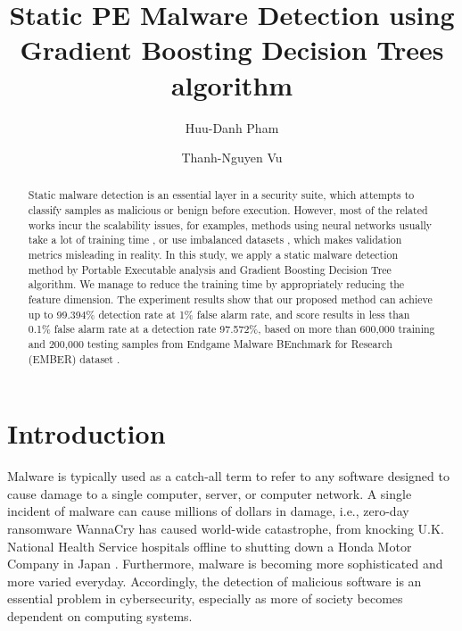 \documentclass[runningheads]{llncs}
\begin{document}
\title{Static PE Malware Detection using Gradient Boosting Decision Trees algorithm}

\author{Huu-Danh Pham \and Thanh-Nguyen Vu}

%
\maketitle              %
%

\begin{abstract}
Static malware detection is an essential layer in a security suite, which attempts to classify samples as malicious or benign before execution. 
However, most of the related works incur the scalability issues, for examples, methods using neural networks usually take a lot of training time \cite{raff2017malware}, or use imbalanced datasets \cite{saxe2015deep,vu2017metamorphic}, which makes validation metrics misleading in reality.  In this study, we apply a static malware detection method by Portable Executable analysis and Gradient Boosting Decision Tree algorithm. 
We manage to reduce the training time by appropriately reducing the feature dimension. 
The experiment results show that our proposed method can achieve up to 99.394\% detection rate at 1\% false alarm rate, and score results in less than 0.1\% false alarm rate at a detection rate 97.572\%, based on more than 600,000 training and 200,000 testing samples from Endgame Malware BEnchmark for Research (EMBER) dataset \cite{anderson2018ember}.

\end{abstract}
%
%
%
\section{Introduction}

Malware is typically used as a catch-all term to refer to any software designed to cause damage to a single computer, server, or computer network.  
A single incident of malware can cause millions of dollars in damage, i.e., zero-day ransomware WannaCry has caused world-wide catastrophe, from knocking U.K. National Health Service hospitals offline to shutting down a Honda Motor Company in Japan \cite{chen2017automated}. 
Furthermore, malware is becoming more sophisticated and more varied everyday. 
Accordingly, the detection of malicious software is an essential problem in cybersecurity, especially as more of society becomes dependent on computing systems.
\end{document}
